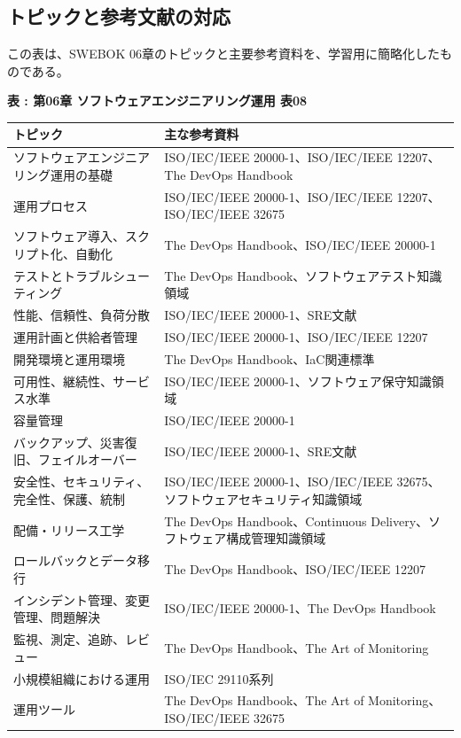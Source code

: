 \subsection{トピックと参考文献の対応}

この表は、SWEBOK 06章のトピックと主要参考資料を、学習用に簡略化したものである。

\par\smallskip\noindent{}\label{tab:ch06-08}\textbf{表 \thetable: 第06章 ソフトウェアエンジニアリング運用 表08}\par\smallskip
\begin{longtable}{L{70mm}L{80mm}}
\toprule
トピック & 主な参考資料 \\
\midrule
ソフトウェアエンジニアリング運用の基礎 & ISO/IEC/IEEE 20000-1、ISO/IEC/IEEE 12207、The DevOps Handbook \\
運用プロセス & ISO/IEC/IEEE 20000-1、ISO/IEC/IEEE 12207、ISO/IEC/IEEE 32675 \\
ソフトウェア導入、スクリプト化、自動化 & The DevOps Handbook、ISO/IEC/IEEE 20000-1 \\
テストとトラブルシューティング & The DevOps Handbook、ソフトウェアテスト知識領域 \\
性能、信頼性、負荷分散 & ISO/IEC/IEEE 20000-1、SRE文献 \\
運用計画と供給者管理 & ISO/IEC/IEEE 20000-1、ISO/IEC/IEEE 12207 \\
開発環境と運用環境 & The DevOps Handbook、IaC関連標準 \\
可用性、継続性、サービス水準 & ISO/IEC/IEEE 20000-1、ソフトウェア保守知識領域 \\
容量管理 & ISO/IEC/IEEE 20000-1 \\
バックアップ、災害復旧、フェイルオーバー & ISO/IEC/IEEE 20000-1、SRE文献 \\
安全性、セキュリティ、完全性、保護、統制 & ISO/IEC/IEEE 20000-1、ISO/IEC/IEEE 32675、ソフトウェアセキュリティ知識領域 \\
配備・リリース工学 & The DevOps Handbook、Continuous Delivery、ソフトウェア構成管理知識領域 \\
ロールバックとデータ移行 & The DevOps Handbook、ISO/IEC/IEEE 12207 \\
インシデント管理、変更管理、問題解決 & ISO/IEC/IEEE 20000-1、The DevOps Handbook \\
監視、測定、追跡、レビュー & The DevOps Handbook、The Art of Monitoring \\
小規模組織における運用 & ISO/IEC 29110系列 \\
運用ツール & The DevOps Handbook、The Art of Monitoring、ISO/IEC/IEEE 32675 \\
\bottomrule
\end{longtable}
